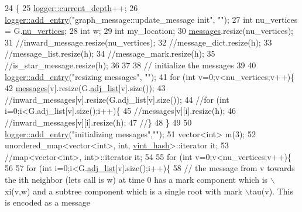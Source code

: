 \begin{DoxyCode}
24 \{
25   \hyperlink{classlogger_a9d29b49bd318a719a8e85b59eac54fe0}{logger::current\_depth}++;
26   \hyperlink{classlogger_a710163deb17bc81f70d53d285b8ac9ac}{logger::add\_entry}(\textcolor{stringliteral}{"graph\_message::update\_message init"}, \textcolor{stringliteral}{""});
27   \textcolor{keywordtype}{int} nu\_vertices = G.\hyperlink{classmarked__graph_acf79c6aeb8f32614cb14a5baaa6c9f9b}{nu\_vertices};
28   \textcolor{keywordtype}{int} w;
29   \textcolor{keywordtype}{int} my\_location;
30   \hyperlink{classgraph__message_af680c8a1755cf8d4aba389c1a3d6634e}{messages}.resize(nu\_vertices);
31   \textcolor{comment}{//inward\_message.resize(nu\_vertices);}
32   \textcolor{comment}{//message\_dict.resize(h);}
33   \textcolor{comment}{//message\_list.resize(h);}
34   \textcolor{comment}{//message\_mark.resize(h);}
35   \textcolor{comment}{//is\_star\_message.resize(h);}
36 
37   
38   \textcolor{comment}{// initialize the messages}
39 
40   \hyperlink{classlogger_a710163deb17bc81f70d53d285b8ac9ac}{logger::add\_entry}(\textcolor{stringliteral}{"resizing messages"}, \textcolor{stringliteral}{""});
41   \textcolor{keywordflow}{for} (\textcolor{keywordtype}{int} v=0;v<nu\_vertices;v++)\{
42     \hyperlink{classgraph__message_af680c8a1755cf8d4aba389c1a3d6634e}{messages}[v].resize(G.\hyperlink{classmarked__graph_a1a0bf7ca413a278763f7c878b3b6fd6f}{adj\_list}[v].size());
43     \textcolor{comment}{//inward\_messages[v].resize(G.adj\_list[v].size());}
44     \textcolor{comment}{//for (int i=0;i<G.adj\_list[v].size();i++)\{}
45     \textcolor{comment}{//messages[v][i].resize(h);}
46       \textcolor{comment}{//inward\_messages[v][i].resize(h);}
47     \textcolor{comment}{//\}}
48   \}
49 
50   \hyperlink{classlogger_a710163deb17bc81f70d53d285b8ac9ac}{logger::add\_entry}(\textcolor{stringliteral}{"initializing messages"},\textcolor{stringliteral}{""});
51   vector<int> m(3);
52   unordered\_map<vector<int>, int, \hyperlink{structvint__hash}{vint\_hash}>::iterator it;
53   \textcolor{comment}{//map<vector<int>, int>::iterator it;}
54 
55   \textcolor{keywordflow}{for} (\textcolor{keywordtype}{int} v=0;v<nu\_vertices;v++)\{
56 
57     \textcolor{keywordflow}{for} (\textcolor{keywordtype}{int} i=0;i<G.\hyperlink{classmarked__graph_a1a0bf7ca413a278763f7c878b3b6fd6f}{adj\_list}[v].size();i++)\{
58       \textcolor{comment}{// the message from v towards the ith neighbor (lets call is w) at time 0 has a mark component which
       is \(\backslash\)xi(v,w) and a subtree component which is a single root with mark \(\backslash\)tau(v). This is encoded as a message
}
\end{DoxyCode}
